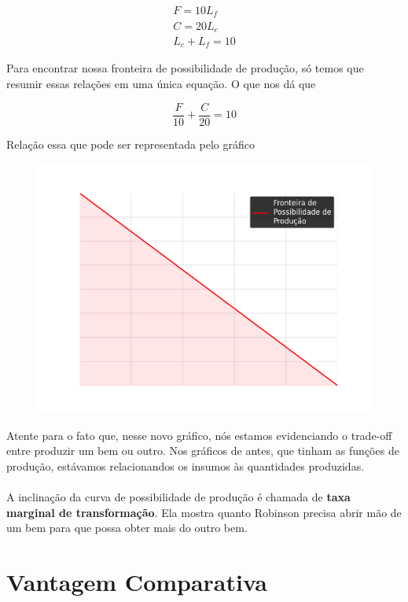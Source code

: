 \documentclass[a4paper,11pt,oneside]{book}
\theoremstyle{definition}
\theoremstyle{break}
\begin{document}
\begin{equation*}
	\begin{split}
		F = 10L_f \\
		C = 20L_c	\\
		L_c + L_f = 10
	\end{split}
\end{equation*}

Para encontrar nossa fronteira de possibilidade de produção, só temos que resumir essas relações em uma única equação. O que nos dá que

$$\frac{F}{10} + \frac{C}{20} = 10$$

Relação essa que pode ser representada pelo gráfico

\begin{figure}[H]
	\centering
	\includegraphics[scale=0.6]{cap33_9-pos_prod1.png}
\end{figure}

Atente para o fato que, nesse novo gráfico, nós estamos evidenciando o trade-off entre produzir um bem ou outro. Nos gráficos de antes, que tinham as funções de produção, estávamos relacionandos os insumos às quantidades produzidas.
\\
\\
A inclinação da curva de possibilidade de produção é chamada de \textbf{taxa marginal de transformação}. Ela mostra quanto Robinson precisa abrir mão de um bem para que possa obter mais do outro bem.

\section{Vantagem Comparativa}
\end{document}
